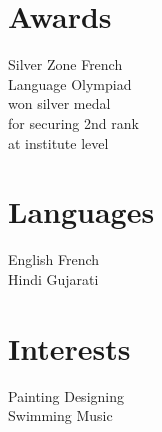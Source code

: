 \begin{minipage}[t]{0.33\textwidth}

\section{Awards} 
\textbullet{} Silver Zone French \\ Language Olympiad \\ won silver medal \\ for securing 2nd rank \\ at institute level




\section{Languages}
English \textbullet{}  French \\ Hindi \textbullet{} Gujarati \\





\section{Interests}
Painting \textbullet{} Designing \\ Swimming \textbullet{} Music \\


%
%

\end{minipage} 
\hfill
